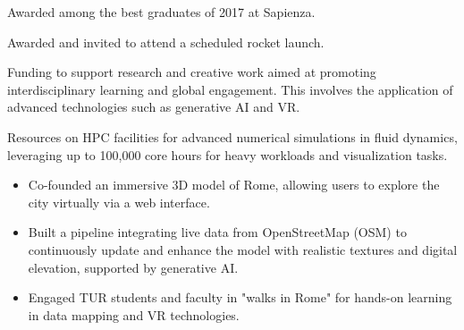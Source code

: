 	\begin{paracol}{2}


		Awarded among the best graduates of 2017 at Sapienza.

		\bigskip

		Awarded and invited to attend a scheduled rocket launch.

		\switchcolumn


		Funding to support research and creative work aimed at promoting interdisciplinary learning and global engagement. This involves the application of advanced technologies such as generative AI and VR.

		\bigskip

		Resources on HPC facilities for advanced numerical simulations in fluid dynamics, leveraging up to 100,000 core hours for heavy workloads and visualization tasks.



	\end{paracol}
\else

	\begin{itemize}
		\item Co-founded an immersive 3D model of Rome, allowing users to explore the city virtually via a web interface.
		\item Built a pipeline integrating live data from OpenStreetMap (OSM) to continuously update and enhance the model with realistic textures and digital elevation, supported by generative AI.
		\item Engaged TUR students and faculty in "walks in Rome" for hands-on learning in data mapping and VR technologies.
	\end{itemize}
	\smallskip
\fi

